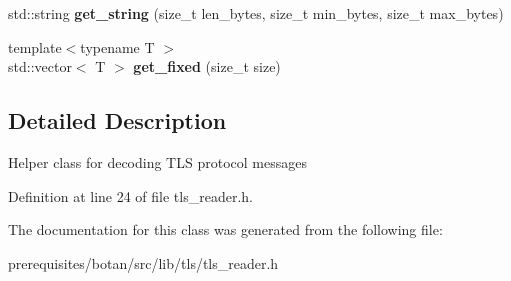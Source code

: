 \begin{DoxyCompactItemize}
\mbox{\label{class_botan_1_1_t_l_s_1_1_t_l_s___data___reader_a0177be13e0d96d8e07b0897918029906}} 
std\+::string {\bfseries get\+\_\+string} (size\+\_\+t len\+\_\+bytes, size\+\_\+t min\+\_\+bytes, size\+\_\+t max\+\_\+bytes)
\item 
\mbox{\label{class_botan_1_1_t_l_s_1_1_t_l_s___data___reader_ae9a8f7875592cccded599cebdba79e87}} 
{\footnotesize template$<$typename T $>$ }\\std\+::vector$<$ T $>$ {\bfseries get\+\_\+fixed} (size\+\_\+t size)
\end{DoxyCompactItemize}


\subsection{Detailed Description}
Helper class for decoding T\+LS protocol messages 

Definition at line 24 of file tls\+\_\+reader.\+h.



The documentation for this class was generated from the following file\+:\begin{DoxyCompactItemize}
\item 
prerequisites/botan/src/lib/tls/tls\+\_\+reader.\+h\end{DoxyCompactItemize}
